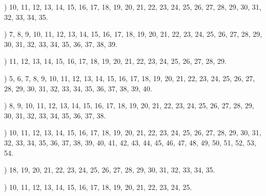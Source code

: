 \documentclass[a4paper,11pt]{article}
\begin{document}
\vspace{\spaceFour}



\noindent
{}) 10, 11, 12, 13, 14, 15, 16, 17, 18, 19, 20, 21, 22,
23, 24, 25, 26, 27, 28, 29, 30, 31, 32, 33, 34, 35.

\vspace{\spaceFour}



\noindent
{}) 7, 8, 9, 10, 11, 12, 13, 14, 15, 16, 17, 18, 19, 20,
21, 22, 23, 24, 25, 26, 27, 28, 29, 30, 31, 32, 33, 34, 35, 36, 37,
38, 39.

\vspace{\spaceFour}



\noindent
{}) 11, 12, 13, 14, 15, 16, 17, 18, 19, 20, 21, 22, 23,
24, 25, 26, 27, 28, 29.

\vspace{\spaceFour}



\noindent
{}) 5, 6, 7, 8, 9, 10, 11, 12, 13, 14, 15, 16, 17, 18,
19, 20, 21, 22, 23, 24, 25, 26, 27, 28, 29, 30, 31, 32, 33, 34, 35,
36, 37, 38, 39, 40.

\vspace{\spaceFour}



\noindent
{}) 8, 9, 10, 11, 12, 13, 14, 15, 16, 17, 18, 19, 20, 21,
22, 23, 24, 25, 26, 27, 28, 29, 30, 31, 32, 33, 34, 35, 36, 37, 38.

\vspace{\spaceFour}



\noindent
{}) 10, 11, 12, 13, 14, 15, 16, 17, 18, 19, 20, 21, 22,
23, 24, 25, 26, 27, 28, 29, 30, 31, 32, 33, 34, 35, 36, 37, 38, 39,
40, 41, 42, 43, 44, 45, 46, 47, 48, 49, 50, 51, 52, 53, 54.

\vspace{\spaceFour}



\noindent
{}) 18, 19, 20, 21, 22, 23, 24, 25, 26, 27, 28, 29, 30,
31, 32, 33, 34, 35.

\vspace{\spaceFour}



\noindent
{}) 10, 11, 12, 13, 14, 15, 16, 17, 18, 19, 20, 21, 22,
23, 24, 25.

\vspace{\spaceFour}
\end{document}
